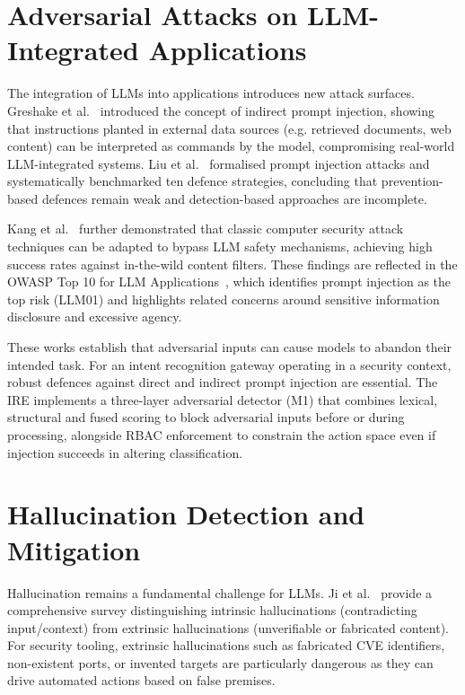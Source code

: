 \section{Adversarial Attacks on LLM-Integrated Applications}\label{sec:lit-adversarial}

The integration of LLMs into applications introduces new attack surfaces. Greshake et al.~\cite{greshake2023indirect} introduced the concept of indirect prompt injection, showing that instructions planted in external data sources (e.g. retrieved documents, web content) can be interpreted as commands by the model, compromising real-world LLM-integrated systems. Liu et al.~\cite{liu2023promptinjection} formalised prompt injection attacks and systematically benchmarked ten defence strategies, concluding that prevention-based defences remain weak and detection-based approaches are incomplete.

Kang et al.~\cite{kang2024dualuse} further demonstrated that classic computer security attack techniques can be adapted to bypass LLM safety mechanisms, achieving high success rates against in-the-wild content filters. These findings are reflected in the OWASP Top 10 for LLM Applications~\cite{owasp2025}, which identifies prompt injection as the top risk (LLM01) and highlights related concerns around sensitive information disclosure and excessive agency.

These works establish that adversarial inputs can cause models to abandon their intended task. For an intent recognition gateway operating in a security context, robust defences against direct and indirect prompt injection are essential. The IRE implements a three-layer adversarial detector (M1) that combines lexical, structural and fused scoring to block adversarial inputs before or during processing, alongside RBAC enforcement to constrain the action space even if injection succeeds in altering classification.

\section{Hallucination Detection and Mitigation}\label{sec:lit-hallucination}

Hallucination remains a fundamental challenge for LLMs. Ji et al.~\cite{ji2023hallucination} provide a comprehensive survey distinguishing intrinsic hallucinations (contradicting input/context) from extrinsic hallucinations (unverifiable or fabricated content). For security tooling, extrinsic hallucinations such as fabricated CVE identifiers, non-existent ports, or invented targets are particularly dangerous as they can drive automated actions based on false premises.

